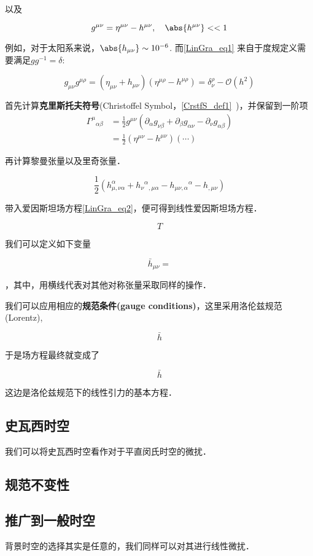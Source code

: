以及

\begin{equation}\label{LinGra_eq1}
g^{\mu\nu} = \eta^{\mu\nu} - h^{\mu\nu} , \quad \abs{h^{\mu\nu}}<<1 
\end{equation}



例如，对于太阳系来说，$\abs{h_{\mu\nu}} \sim 10^{-6}$. 而\autoref{LinGra_eq1} 来自于度规定义需要满足$gg^{-1}=\delta$:

\begin{equation}
g_{\mu\nu}g^{\mu\rho} = (\eta_{\mu\nu} + h_{\mu\nu})(\eta^{\mu\rho} - h^{\mu\rho}) = \delta^{\rho}_{\nu} - \mathcal{O}(h^2)
\end{equation}

首先计算\textbf{克里斯托夫符号}(Christoffel Symbol，\autoref{CrstfS_def1}~)，并保留到一阶项
\begin{align}
\Gamma^{\mu}{}_{\alpha\beta}&=\frac{1}{2}g^{\mu\nu}(\partial_\alpha g_{\nu\beta} + \partial_\beta g_{\alpha\nu} - \partial_\nu g_{\alpha\beta})\\
&=\frac{1}{2}(\eta^{\mu\nu} - h^{\mu\nu})(\cdots)
\end{align}


再计算黎曼张量以及里奇张量．

\begin{equation}
\frac{1}{2}\left(h_{\mu, \nu \alpha}^{\alpha}+h_{\nu}{ }^{\alpha}{ }_{, \mu \alpha}-h_{\mu \nu, \alpha}{ }^{\alpha}-h_{, \mu \nu}\right)
\end{equation}

带入爱因斯坦场方程\autoref{LinGra_eq2}，便可得到线性爱因斯坦场方程．

\begin{equation}
T
\end{equation}

我们可以定义如下变量

\begin{equation}
\bar{h}_{\mu\nu} = 
\end{equation}

，其中，用横线代表对其他对称张量采取同样的操作．

我们可以应用相应的\textbf{规范条件(gauge conditions)}，这里采用洛伦兹规范(Lorentz),

\begin{equation}
\bar{h}
\end{equation}

于是场方程最终就变成了

\begin{equation}
\bar{h}
\end{equation}

这边是洛伦兹规范下的线性引力的基本方程．


\subsection{史瓦西时空}

我们可以将史瓦西时空看作对于平直闵氏时空的微扰．


\subsection{规范不变性}


\subsection{推广到一般时空}

背景时空的选择其实是任意的，我们同样可以对其进行线性微扰．

